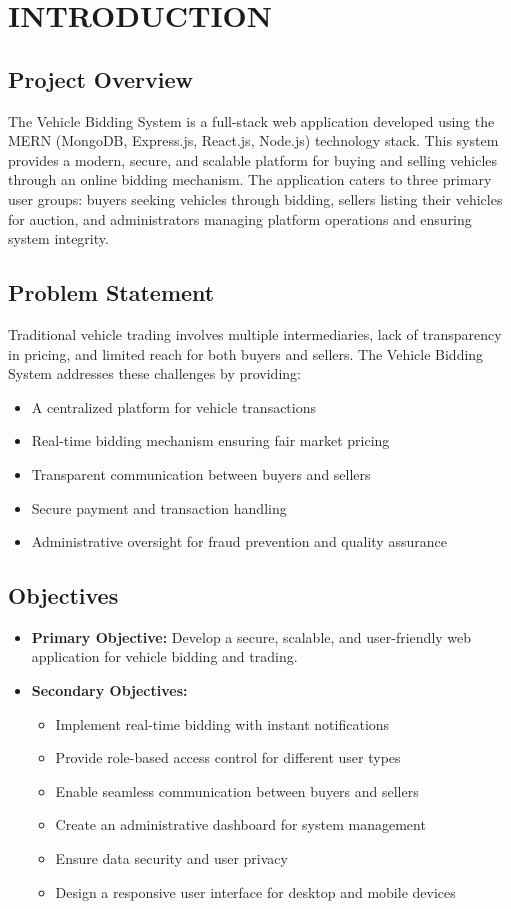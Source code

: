 \chapter{INTRODUCTION}

\section{Project Overview}
The Vehicle Bidding System is a full-stack web application developed using the MERN (MongoDB, Express.js, React.js, Node.js) technology stack. This system provides a modern, secure, and scalable platform for buying and selling vehicles through an online bidding mechanism. The application caters to three primary user groups: buyers seeking vehicles through bidding, sellers listing their vehicles for auction, and administrators managing platform operations and ensuring system integrity.

\section{Problem Statement}
Traditional vehicle trading involves multiple intermediaries, lack of transparency in pricing, and limited reach for both buyers and sellers. The Vehicle Bidding System addresses these challenges by providing:
\begin{itemize}
    \item A centralized platform for vehicle transactions
    \item Real-time bidding mechanism ensuring fair market pricing
    \item Transparent communication between buyers and sellers
    \item Secure payment and transaction handling
    \item Administrative oversight for fraud prevention and quality assurance
\end{itemize}

\section{Objectives}
\begin{itemize}
    \item \textbf{Primary Objective:} Develop a secure, scalable, and user-friendly web application for vehicle bidding and trading.
    \item \textbf{Secondary Objectives:}
    \begin{itemize}
        \item Implement real-time bidding with instant notifications
        \item Provide role-based access control for different user types
        \item Enable seamless communication between buyers and sellers
        \item Create an administrative dashboard for system management
        \item Ensure data security and user privacy
        \item Design a responsive user interface for desktop and mobile devices
    \end{itemize}
\end{itemize}

